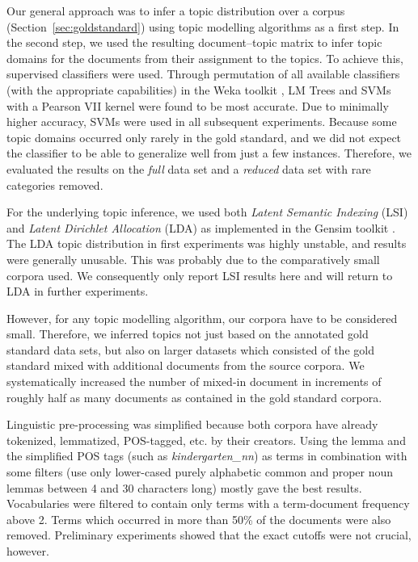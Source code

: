 \documentclass[11pt]{article}
\begin{document}
Our general approach was to infer a topic distribution over a corpus (Section~\ref{sec:goldstandard}) using topic modelling algorithms as a first step.
In the second step, we used the resulting document--topic matrix to infer topic domains for the documents from their assignment to the topics.
To achieve this, supervised classifiers were used.
Through permutation of all available classifiers (with the appropriate capabilities) in the Weka toolkit \cite{HallWitten2011}, LM Trees \cite{LandwehrEa2005} and SVMs with a Pearson VII kernel \cite{UstunEa2006} were found to be most accurate.
Due to minimally higher accuracy, SVMs were used in all subsequent experiments.
Because some topic domains occurred only rarely in the gold standard, and we did not expect the classifier to be able to generalize well from just a few instances.
Therefore, we evaluated the results on the \textit{full} data set and a \textit{reduced} data set with rare categories removed.

For the underlying topic inference, we used both \textit{Latent Semantic Indexing} (LSI) \cite{LSAHandbook} and \textit{Latent Dirichlet Allocation} (LDA) \cite{BleiEa2003} as implemented in the Gensim toolkit \cite{RehurekSojka2010}.
The LDA topic distribution in first experiments was highly unstable, and results were generally unusable.
This was probably due to the comparatively small corpora used.
We consequently only report LSI results here and will return to LDA in further experiments.

However, for any topic modelling algorithm, our corpora have to be considered small.
Therefore, we inferred topics not just based on the annotated gold standard data sets, but also on larger datasets which consisted of the gold standard mixed with additional documents from the source corpora.
We systematically increased the number of mixed-in document in increments of roughly half as many documents as contained in the gold standard corpora.

Linguistic pre-processing was simplified because both corpora have already tokenized, lemmatized, POS-tagged, etc. by their creators.
Using the lemma and the simplified POS tags (such as \textit{kindergarten\_nn}) as terms in combination with some filters (use only lower-cased purely alphabetic common and proper noun lemmas between 4 and 30 characters long) mostly gave the best results.
Vocabularies were filtered to contain only terms with a term-document frequency above 2.
Terms which occurred in more than 50\% of the documents were also removed.
Preliminary experiments showed that the exact cutoffs were not crucial, however.
\end{document}
